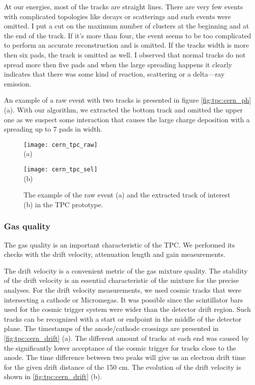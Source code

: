 \documentclass[../main.tex]{subfiles}
\begin{document}
At our energies, most of the tracks are straight lines. There are very few events with complicated topologies like decays or scatterings and such events were omitted.  I put a cut on the maximum number of clusters at the beginning and at the end of the track. If it's more than four, the event seems to be too complicated to perform an accurate reconstruction and is omitted. If the tracks width is more then six pads, the track is omitted as well. I observed that normal tracks do not spread more then five pads and when the large spreading happens it clearly indicates that there was some kind of reaction, scattering or a delta---ray emission.

An example of a raw event with two tracks is presented in figure \autoref{fig:tpc:cern_ph} (a). With our algorithm, we extracted the bottom track and omitted the upper one as we suspect some interaction that causes the large charge deposition with a spreading up to 7 pads in width.

\begin{figure}[!ht]
  \centering
  \begin{minipage}{0.49\linewidth}
    \centering
    \texttt{[image: cern\_tpc\_raw]} \\ (a)
  \end{minipage}
  \begin{minipage}{0.49\linewidth}
    \centering
    \texttt{[image: cern\_tpc\_sel]} \\ (b)
  \end{minipage}
  \caption{The example of the raw event (a) and the extracted track of interest (b) in the TPC prototype.}
  \label{fig:tpc:cern_ph}
\end{figure}

\subsubsection{Gas quality}
The gas quality is an important characteristic of the TPC. We performed its checks with the drift velocity, attenuation length and gain measurements.

The drift velocity is a convenient metric of the gas mixture quality. The stability of the drift velocity is an essential characteristic of the mixture for the precise analyses. For the drift velocity measurements, we used cosmic tracks that were intersecting a cathode or Micromegas. It was possible since the scintillator bars used for the cosmic trigger system were wider than the detector drift region. Such tracks can be recognized with a start or endpoint in the middle of the detector plane. The timestamps of the anode/cathode crossings are presented in \autoref{fig:tpc:cern_drift} (a). The different amount of tracks at each end was caused by the significantly lower acceptance of the cosmic trigger for tracks close to the anode. The time difference between two peaks will give us an electron drift time for the given drift distance of the 150 cm. The evolution of the drift velocity is shown in \autoref{fig:tpc:cern_drift} (b).
\end{document}
